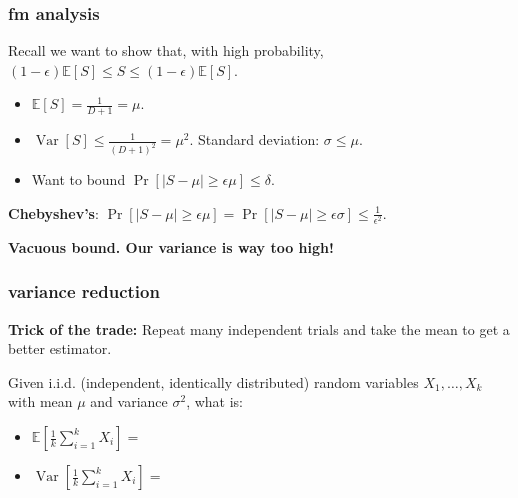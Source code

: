 \documentclass[handout,compress]{beamer}
\newcommand{\E}{\mathbb{E}}
\DeclareMathOperator{\Var}{Var}
\begin{document}
\begin{frame}
	\frametitle{fm analysis}
	Recall we want to show that, with high probability, $(1-\epsilon) \E[S] \leq S \leq (1-\epsilon) \E[S]$. \vspace{1em}
	\begin{itemize}
		\item $\E[S] = \frac{1}{D+1} = \mu.$ \vspace{.5em}
		\item $\Var[S] \leq \frac{1}{(D+1)^2} = \mu^2$. Standard deviation: $\sigma \leq \mu$. \vspace{.5em}
		\item Want to bound $\Pr[|S - \mu| \geq \epsilon \mu] \leq \delta$. \vspace{.5em}
	\end{itemize}
	
	\textbf{Chebyshev's}: $\Pr[|S - \mu| \geq \epsilon \mu] = \Pr[|S - \mu| \geq \epsilon \sigma] \leq \frac{1}{\epsilon^2}$.
	
	\begin{center}
	\alert{\textbf{Vacuous bound. Our variance is way too high!}}
	\end{center}
\end{frame}


\begin{frame}
	\frametitle{variance reduction}
	\textbf{Trick of the trade:} Repeat many independent trials and take the mean to get a better estimator.
	
	Given i.i.d. (independent, identically distributed) random variables $X_1, \ldots, X_k$ with mean $\mu$ and variance $\sigma^2$, what is:
	\begin{itemize}
		\item $\E\left[\frac{1}{k}\sum_{i=1}^k X_i\right] = $
		\vspace{1em}
		\item $\Var\left[\frac{1}{k}\sum_{i=1}^k X_i\right] = $
	\end{itemize} 
\end{frame}
\end{document}

